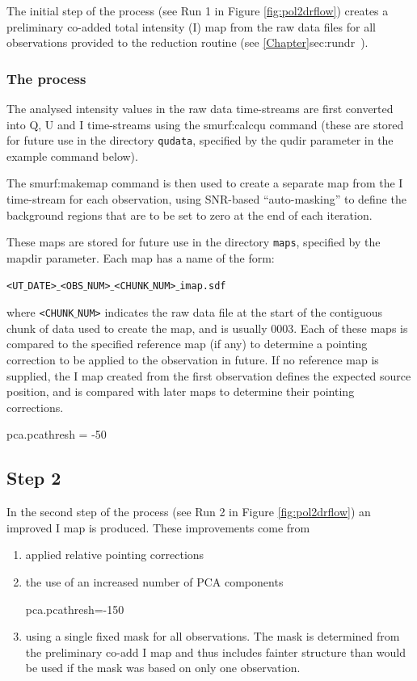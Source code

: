 The initial step of the process (see Run 1 in Figure \ref{fig:pol2drflow}) creates
a preliminary co-added total intensity (I) map from the raw data files for all
observations provided to the reduction routine (see \cref{Chapter}{sec:rundr}\ ).


\subsubsection*{The process}
The analysed intensity values in the raw data time-streams are first
converted into Q, U and I time-streams using the smurf:calcqu command (these are
stored for future use in the directory \texttt{qudata}, specified by the qudir
parameter in the example command below).

The smurf:makemap command is then used to create a separate map from the
I time-stream for each observation, using SNR-based ``auto-masking'' to
define the background regions that are to be set to zero at the end of
each iteration.

These maps are stored for future use in the directory \texttt{maps},
specified by the mapdir parameter. Each map has a name of the form:

\texttt{<UT$\_$DATE>$\_$<OBS$\_$NUM>$\_$<CHUNK$\_$NUM>$\_$imap.sdf}

where \texttt{<CHUNK$\_$NUM>} indicates the raw data file at the start of
the contiguous chunk of data used to create the map, and is usually 0003.
Each of these maps is compared to the specified reference map (if any) to
determine a pointing correction to be applied to the observation in
future. If no reference map is supplied, the I map created from the
first observation defines the expected source position, and is compared
with later maps to determine their pointing corrections.

pca.pcathresh = -50



\subsection*{Step 2}

In the second step of the process (see Run 2 in Figure
\ref{fig:pol2drflow}) an improved I map is produced. These improvements
come from
\begin{enumerate}
\item applied relative pointing corrections
\item the use of an increased number of PCA components

pca.pcathresh=-150
\item using a single fixed mask for all observations. The mask is
determined from the preliminary co-add I map and thus includes
fainter structure than would be used if the mask was based on only
one observation.
\end{enumerate}

